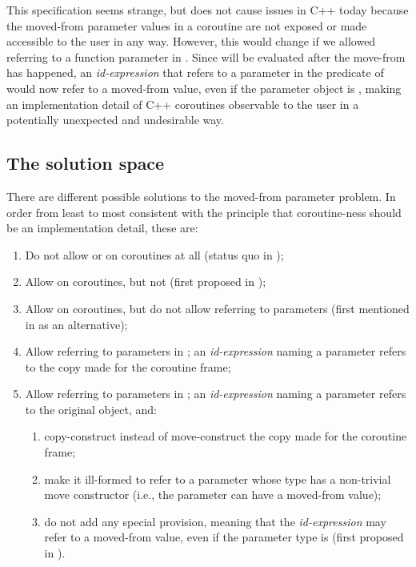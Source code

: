 This specification seems strange, but does not cause issues in C++ today because the moved-from parameter values in a coroutine are not exposed or made accessible to the user in any way. However, this would change if we allowed referring to a function parameter in . Since  will be evaluated after the move-from has happened, an \emph{id-expression} that refers to a parameter in the predicate of  would now refer to a moved-from value, even if the parameter object is , making an implementation detail of C++ coroutines observable to the user in a potentially unexpected and undesirable way.

\subsection{The solution space}
\label{solutions}

There are different possible solutions to the moved-from parameter problem. In order from least to most consistent with the principle that coroutine-ness should be an implementation detail, these are:
\begin{enumerate}
\item Do not allow  or  on coroutines at all (status quo in \cite{P2900R8});
\item Allow  on coroutines, but not  (first proposed in \cite{P2957R1});
\item Allow  on coroutines, but do not allow referring to parameters (first mentioned in \cite{P2957R1} as an alternative);
\item Allow referring to parameters in ; an \emph{id-expression} naming a parameter refers to the copy made for the coroutine frame;
\item Allow referring to parameters in ; an \emph{id-expression} naming a parameter refers to the original object, and:
\begin{enumerate}[label=\alph*.,ref=\theenumi\alph*]
        \item copy-construct instead of move-construct the copy made for the coroutine frame;
        \item make it ill-formed to refer to a parameter whose type has a non-trivial move constructor (i.e., the parameter can have a moved-from value);
        \item do not add any special provision, meaning that the \emph{id-expression} may refer to a moved-from value, even if the parameter type is  (first proposed in \cite{P2957R0}).
\end{enumerate}
\end{enumerate}

